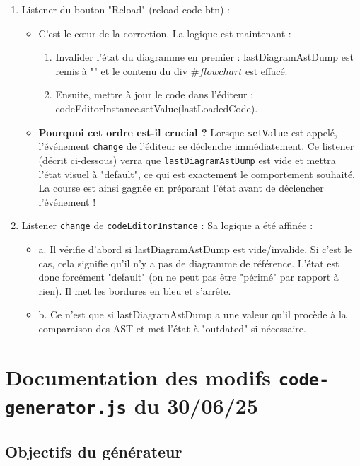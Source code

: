 \documentclass[11pt,a4paper]{article}
\begin{document}
\begin{enumerate}
    \item Listener du bouton "Reload" (reload-code-btn) :
    \begin{itemize}
        \item C'est le cœur de la correction. La logique est maintenant :
        \begin{enumerate}
            \item Invalider l'état du diagramme en premier : lastDiagramAstDump est remis à "" et le contenu du div $\#flowchart$ est effacé.
            \item Ensuite, mettre à jour le code dans l'éditeur : codeEditorInstance.setValue(lastLoadedCode).
        \end{enumerate}
        \item \textbf{Pourquoi cet ordre est-il crucial ?} Lorsque \texttt{setValue} est appelé, l'événement \texttt{change} de l'éditeur se déclenche immédiatement. Ce listener (décrit ci-dessous) verra que \texttt{lastDiagramAstDump} est vide et mettra l'état visuel à "default", ce qui est exactement le comportement souhaité. La course est ainsi gagnée en préparant l'état avant de déclencher l'événement !
    \end{itemize}

    \item Listener \texttt{change} de \texttt{codeEditorInstance} :
Sa logique a été affinée :
    \begin{itemize}
        \item a. Il vérifie d'abord si lastDiagramAstDump est vide/invalide. Si c'est le cas, cela signifie qu'il n'y a pas de diagramme de référence. L'état est donc forcément "default" (on ne peut pas être "périmé" par rapport à rien). Il met les bordures en bleu et s'arrête.
        \item b. Ce n'est que si lastDiagramAstDump a une valeur qu'il procède à la comparaison des AST et met l'état à "outdated" si nécessaire.
    \end{itemize}
    \end{enumerate}
\newpage

\section{Documentation des modifs \texttt{code-generator.js} du 30/06/25}

\subsection{Objectifs du générateur}
\end{document}
